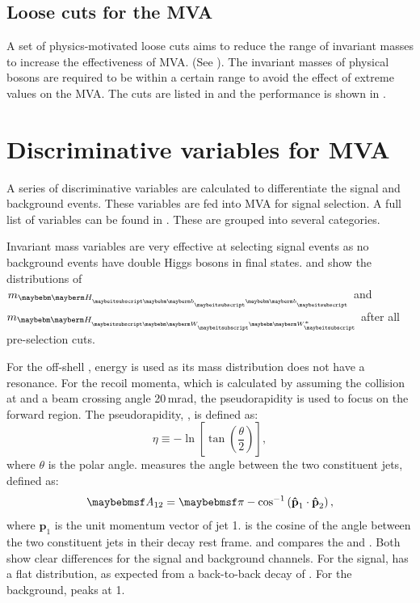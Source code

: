 \subsection{Loose cuts for the MVA}

A set of physics-motivated loose cuts aims to reduce the range of invariant masses to increase the effectiveness of MVA. (See ). The invariant masses of physical bosons are required to be within a certain range to avoid the effect of extreme values on the MVA. The cuts are listed in  and the performance is shown in .


\section{Discriminative variables for MVA}

A series of discriminative variables are calculated to differentiate the signal and background events. These variables are fed into MVA for signal selection. A full list of variables can be found in . These are grouped into several categories.

Invariant mass variables are very effective at selecting signal events as no background events have double Higgs bosons in final states.  and  show the distributions of $m_{\Hbb}$ and $m_{\HWW}$ after all pre-selection cuts.

For the off-shell \W*, energy is used as its mass distribution does not have a resonance. For the recoil momenta, which is calculated by assuming the collision at \sqrtS and a beam crossing angle 20\,mrad, the pseudorapidity is used to focus on the forward region. The pseudorapidity, \eta, is defined as:
\begin{equation}
\eta \equiv  - \ln \left[ \tan \left( \frac{\theta}{2} \right) \right],
\end{equation}
where $\theta$ is the polar angle.  measures the angle between the two constituent jets, defined as:
\begin{equation}
\acolinearity{12} = \pi - \cos^{-1}\left(\textbf{\^{p}}_1\cdot\textbf{\^{p}}_2\right),
\end{equation}
where $\textbf{\^{p}}_1$ is the unit momentum vector of jet 1.  is the cosine of the angle between the two constituent jets in their decay rest frame.  and  compares the \acolinearity{\Hbb} and  \cosStar{\Hbb}. Both show clear differences for the signal and background channels. For the signal, \cosStar{\Hbb} has a flat distribution, as expected from a back-to-back decay of \HepProcess{\PHiggs \to \Pbottom \APbottom}. For the background, \cosStar{\Hbb} peaks at 1.

